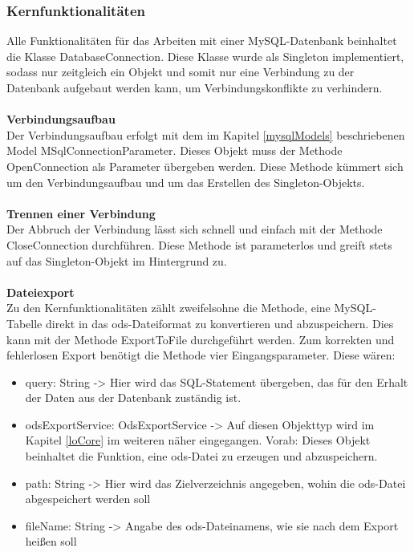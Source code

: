 \subsubsection{Kernfunktionalitäten}
\label{mysqlCore}
Alle Funktionalitäten für das Arbeiten mit einer MySQL-Datenbank beinhaltet die Klasse {\frqq}DatabaseConnection{\flqq}. Diese Klasse wurde als Singleton implementiert, sodass nur zeitgleich ein Objekt und somit nur eine Verbindung zu der Datenbank aufgebaut werden kann, um Verbindungskonflikte zu verhindern.\\\\
\textbf{Verbindungsaufbau}\\
Der Verbindungsaufbau erfolgt mit dem im Kapitel \ref{mysqlModels} beschriebenen Model {\frqq}MSqlConnectionParameter{\flqq}. Dieses Objekt muss der Methode {\frqq}OpenConnection{\flqq} als Parameter übergeben werden. Diese Methode kümmert sich um den Verbindungsaufbau und um das Erstellen des Singleton-Objekts.\\\\
\textbf{Trennen einer Verbindung}\\
Der Abbruch der Verbindung lässt sich schnell und einfach mit der Methode {\frqq}CloseConnection{\flqq} durchführen. Diese Methode ist parameterlos und greift stets auf das Singleton-Objekt im Hintergrund zu.\\\\
\textbf{Dateiexport}\\
Zu den Kernfunktionalitäten zählt zweifelsohne die Methode, eine MySQL-Tabelle direkt in das ods-Dateiformat zu konvertieren und abzuspeichern. Dies kann mit der Methode {\frqq}ExportToFile{\flqq} durchgeführt werden. Zum korrekten und fehlerlosen Export benötigt die Methode vier Eingangsparameter. Diese wären:
\begin{itemize}
\item query: String -> Hier wird das SQL-Statement übergeben, das für den Erhalt der Daten aus der Datenbank zuständig ist.
\item odsExportService: OdsExportService -> Auf diesen Objekttyp wird im Kapitel \ref{loCore} im weiteren näher eingegangen. Vorab: Dieses Objekt beinhaltet die Funktion, eine ods-Datei zu erzeugen und abzuspeichern.
\item path: String -> Hier wird das Zielverzeichnis angegeben, wohin die ods-Datei abgespeichert werden soll
\item fileName: String -> Angabe des ods-Dateinamens, wie sie nach dem Export heißen soll 
\end{itemize}
